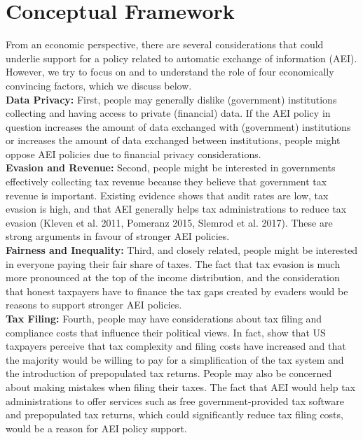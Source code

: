 \documentclass[11pt]{article}
\begin{document}
\section{Conceptual Framework} From an economic perspective, there are several considerations that could underlie support for a policy related to automatic exchange of information (AEI). However, we try to focus on and to understand the role of four economically convincing factors, which we discuss below. \\[0.5em]
\textbf{Data Privacy:} First, people may generally dislike (government) institutions collecting and having access to private (financial) data. If the AEI policy in question increases the amount of data exchanged with (government) institutions or increases the amount of data exchanged between institutions, people might oppose AEI policies due to financial privacy considerations. \\[0.5em]
\textbf{Evasion and Revenue:} Second, people might be interested in governments effectively collecting tax revenue because they believe that government tax revenue is important. Existing evidence shows that audit rates are low, tax evasion is high, and that AEI generally helps tax administrations to reduce tax evasion (Kleven et al. 2011, Pomeranz 2015, Slemrod et al. 2017). These are strong arguments in favour of stronger AEI policies. \\[0.5em]
\textbf{Fairness and Inequality:} Third, and closely related, people might be interested in everyone paying their fair share of taxes. The fact that tax evasion is much more pronounced at the top of the income distribution, and the consideration that honest taxpayers have to finance the tax gaps created by evaders would be reasons to support stronger AEI policies. \\[0.5em]
\textbf{Tax Filing:} Fourth, people may have considerations about tax filing and compliance costs that influence their political views. In fact, \textcite{benzarti2024rising} show that US taxpayers perceive that tax complexity and filing costs have increased and that the majority would be willing to pay for a simplification of the tax system and the introduction of prepopulated tax returns. People may also be concerned about making mistakes when filing their taxes. The fact that AEI would help tax administrations to offer services such as free government-provided tax software and prepopulated tax returns, which could significantly reduce tax filing costs, would be a reason for AEI policy support. \\[1em]
\end{document}
